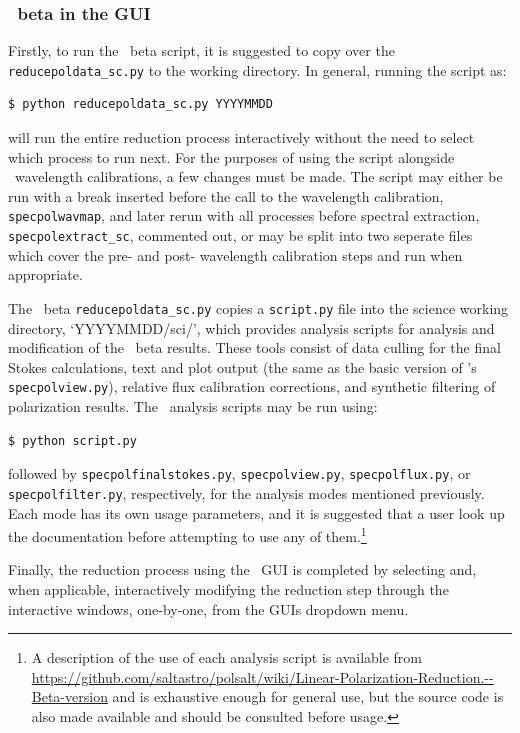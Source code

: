 \subsubsection{\polsalt\ beta in the \gls{GUI}}

Firstly, to run the \polsalt\ beta script, it is suggested to copy over the \texttt{reducepol\-data\_sc.py} to the working directory. In general, running the script as:
\begin{lstlisting}[language=bash]
$ python reducepoldata_sc.py YYYYMMDD
\end{lstlisting}
{\parskip=0pt
will run the entire reduction process interactively without the need to select which process to run next. For the purposes of using the script alongside \iraf\ wavelength calibrations, a few changes must be made. The script may either be run with a break inserted before the call to the wavelength calibration, \texttt{specpolwavmap}, and later rerun with all processes before spectral extraction, \texttt{specpolextract\_sc}, commented out, or may be split into two seperate files which cover the pre- and post- wavelength calibration steps and run when appropriate.
}

The \polsalt\ beta \texttt{reducepoldata\_sc.py} copies a \texttt{script.py} file into the science working directory, `YYYYMMDD/sci/', which provides analysis scripts for analysis and modification of the \polsalt\ beta results. These tools consist of data culling for the final Stokes calculations, text and plot output (the same as the basic version of \polsalt's \texttt{specpolview.py}), relative flux calibration corrections, and synthetic filtering of polarization results. The \polsalt\ analysis scripts may be run using:
\begin{lstlisting}[language=bash]
$ python script.py
\end{lstlisting}
{\parskip=0pt
followed by \texttt{specpolfinalstokes.py}, \texttt{specpolview.py}, \texttt{specpolflux.py}, or \texttt{specpol\-filter.py}, respectively, for the analysis modes mentioned previously. Each mode has its own usage parameters, and it is suggested that a user look up the documentation before attempting to use any of them.\footnote{A description of the use of each analysis script is available from \url{https://github.com/saltastro/polsalt/wiki/Linear-Polarization-Reduction.--Beta-version} and is exhaustive enough for general use, but the source code is also made available and should be consulted before usage.}
}

Finally, the reduction process using the \polsalt\ \gls{GUI} is completed by selecting and, when applicable, interactively modifying the reduction step through the interactive windows, one-by-one, from the \glspl{GUI} dropdown menu.

